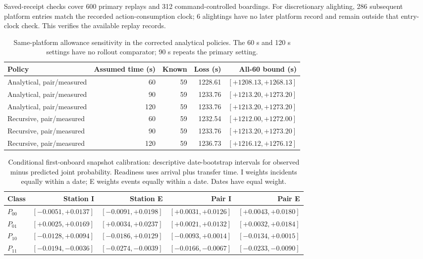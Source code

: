 \documentclass[preprint,12pt,authoryear]{elsarticle}
\begin{document}
Saved-receipt checks cover 600 primary replays and 312 command-controlled boardings. For discretionary alighting, 286 subsequent platform entries match the recorded action-consumption clock; 6 alightings have no later platform record and remain outside that entry-clock check. This verifies the available replay records.

\begin{table}[ht]
\centering\small\setlength{\tabcolsep}{4pt}
\caption{Same-platform allowance sensitivity in the corrected analytical policies. The 60 s and 120 s settings have no rollout comparator; 90 s repeats the primary setting.}
\begin{tabular}{p{}rrrr}
\toprule
Policy & Assumed time (s) & Known & Loss (s) & All-60 bound (s) \\
\midrule
Analytical, pair/measured & 60 & 59 & 1228.61 & $[+1208.13,+1268.13]$ \\
Analytical, pair/measured & 90 & 59 & 1233.76 & $[+1213.20,+1273.20]$ \\
Analytical, pair/measured & 120 & 59 & 1233.76 & $[+1213.20,+1273.20]$ \\
Recursive, pair/measured & 60 & 59 & 1232.54 & $[+1212.00,+1272.00]$ \\
Recursive, pair/measured & 90 & 59 & 1233.76 & $[+1213.20,+1273.20]$ \\
Recursive, pair/measured & 120 & 59 & 1236.73 & $[+1216.12,+1276.12]$ \\
\bottomrule
\end{tabular}
\end{table}

\begin{table}[ht]
\centering\small\setlength{\tabcolsep}{4pt}
\caption{Conditional first-onboard snapshot calibration: descriptive date-bootstrap intervals for observed minus predicted joint probability. Readiness uses arrival plus transfer time. I weights incidents equally within a date; E weights events equally within a date. Dates have equal weight.}
\begin{tabular}{lrrrr}
\toprule
Class & Station I & Station E & Pair I & Pair E \\
\midrule
$P_{00}$ & $[-0.0051,+0.0137]$ & $[-0.0091,+0.0198]$ & $[+0.0031,+0.0126]$ & $[+0.0043,+0.0180]$ \\
$P_{01}$ & $[+0.0025,+0.0169]$ & $[+0.0034,+0.0237]$ & $[+0.0021,+0.0132]$ & $[+0.0032,+0.0184]$ \\
$P_{10}$ & $[-0.0128,+0.0094]$ & $[-0.0186,+0.0129]$ & $[-0.0093,+0.0014]$ & $[-0.0134,+0.0015]$ \\
$P_{11}$ & $[-0.0194,-0.0036]$ & $[-0.0274,-0.0039]$ & $[-0.0166,-0.0067]$ & $[-0.0233,-0.0090]$ \\
\bottomrule
\end{tabular}
\end{table}
\end{document}

